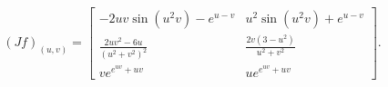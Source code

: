 
\begin{solution}
    $$(Jf)_{(u,v)}=\left[
        \begin{array}{cc}
            -2uv\sin(u^2v)-e^{u-v}
            &u^2\sin(u^2v)+e^{u-v}\\
            \frac{2uv^2-6u}{(u^2+v^2)^2}
            &\frac{2v(3-u^2)}{u^2+v^2}\\
            ve^{e^{uv}+uv}
            &ue^{e^{uv}+uv} 
        \end{array}
    \right].$$
\end{solution}